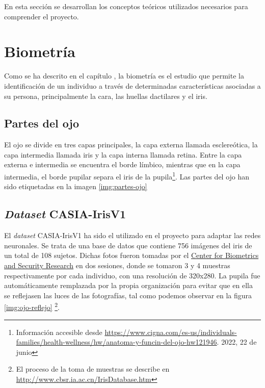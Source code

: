  \label{capitulo3}

En esta sección se desarrollan los conceptos teóricos utilizados necesarios para comprender el proyecto.

\section{Biometría}

Como se ha descrito en el capítulo , la biometría es el estudio que permite la identificación de un individuo a través de determinadas características asociadas a su persona, principalmente la cara, las huellas dactilares y el iris. 

\subsection{Partes del ojo} \label{partesojo}

El ojo se divide en tres capas principales, la capa externa llamada esclereótica, la capa intermedia llamada iris y la capa interna llamada retina. Entre la capa externa e intermedia se encuentra el borde límbico, mientras que en la capa intermedia, el borde pupilar separa el iris de la pupila\footnote{Información accesible desde \url{https://www.cigna.com/es-us/individuals-families/health-wellness/hw/anatoma-y-funcin-del-ojo-hw121946}. 2022, 22 de junio}.
Las partes del ojo han sido etiquetadas en la imagen \ref{img:partes-ojo}


\subsection{\textit{Dataset} CASIA-IrisV1 }	\label{casia}

El \textit{dataset} CASIA-IrisV1 ha sido el utilizado en el proyecto para adaptar las redes neuronales. Se trata de una base de datos que contiene 756 imágenes del iris de un total de 108 sujetos. 
Dichas fotos fueron tomadas por el \href{http://www.cbsr.ia.ac.cn/english/index.asp}{Center for Biometrics and Security Research} en dos sesiones, donde se tomaron 3 y 4 muestras respectivamente por cada individuo, con una resolución de 320x280. 
La pupila fue automáticamente remplazada por la propia organización para evitar que en ella se reflejasen las luces de las fotografías, tal como podemos observar en la figura \ref{img:ojo-reflejo} 
\footnote{El proceso de la toma de muestras se describe en \url{http://www.cbsr.ia.ac.cn/IrisDatabase.htm}}.

